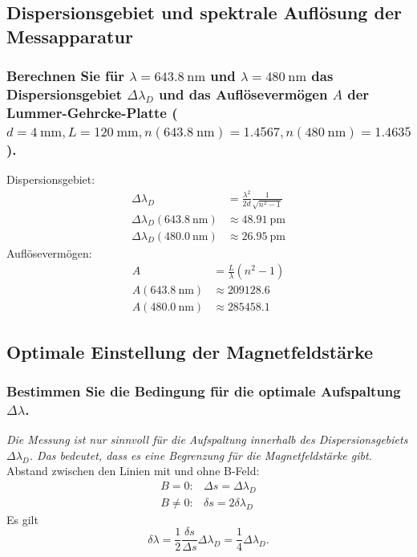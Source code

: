 \subsection{Dispersionsgebiet und spektrale Auflösung der Messapparatur}

\subsubsection[]{Berechnen Sie für $\lambda=\SI{643.8}{\nano\metre}$ und $\lambda=\SI{480}{\nano\metre}$ das Dispersionsgebiet 
$\Delta\lambda_D$  und das Auflösevermögen $A$ der Lummer-Gehrcke-Platte ($d=\SI{4}{\milli\metre}, L=\SI{120}{\milli\metre}, 
n(\SI{643.8}{\nano\metre})=\num{1.4567}, n(\SI{480}{\nano\metre})=\num{1.4635}$).}
Dispersionsgebiet:
\begin{align*}
    \Delta\lambda_D&=\frac{\lambda^2}{2d}\frac{1}{\sqrt{n^2-1}}\\
    \Delta\lambda_D(\SI{643.8}{\nano\metre})&\approx\SI{48.91}{\pico\metre}\\
    \Delta\lambda_D(\SI{480.0}{\nano\metre})&\approx\SI{26.95}{\pico\metre}
\end{align*}
Auflösevermögen:
\begin{align*}
    A&=\frac{L}{\lambda}(n^2-1)\\
    A(\SI{643.8}{\nano\metre})&\approx\num{209128.6}\\
    A(\SI{480.0}{\nano\metre})&\approx\num{285458.1}
\end{align*}


\subsection{Optimale Einstellung der Magnetfeldstärke}

\subsubsection[]{Bestimmen Sie die Bedingung für die optimale Aufspaltung $\Delta\lambda$.}
\textit{Die Messung ist nur sinnvoll für die Aufspaltung innerhalb des Dispersionsgebiets $\Delta\lambda_D$. Das bedeutet, dass 
es eine Begrenzung für die Magnetfeldstärke gibt.}\\
Abstand zwischen den Linien mit und ohne B-Feld:
\begin{align*}
    B=0:    &\Delta s=\Delta\lambda_D\\
    B\neq0: &\delta s=2\delta\lambda_D
\end{align*}
Es gilt
\begin{equation*}
    \delta\lambda=\frac{1}{2}\frac{\delta s}{\Delta s}\Delta\lambda_D=\frac{1}{4}\Delta\lambda_D .
\end{equation*}

